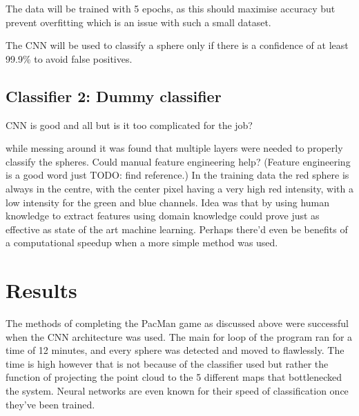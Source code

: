 \documentclass{article}
\begin{document}
The data will be trained with 5 epochs, as this should maximise accuracy but prevent overfitting which is an issue with such a small dataset.


The CNN will be used to classify a sphere only if there is a confidence of at least 99.9\% to avoid false positives. 

\subsection{Classifier 2: Dummy classifier}
CNN is good and all but is it too complicated for the job?

while messing around it was found that multiple layers were needed to properly classify the spheres.
Could manual feature engineering help? (Feature engineering is a good word just TODO: find reference.)
In the training data the red sphere is always in the centre, with the center pixel having a very high red intensity, with a low intensity for the green and blue channels. 
Idea was that by using human knowledge to extract features using domain knowledge could prove just as effective as state of the art machine learning.
Perhaps there'd even be benefits of a computational speedup when a more simple method was used.


\section{Results}

The methods of completing the PacMan game as discussed above were successful when the CNN architecture was used.
The main for loop of the program ran for a time of 12 minutes, and every sphere was detected and moved to flawlessly.
The time is high however that is not because of the classifier used but rather the function of projecting the point cloud to the 5 different maps that bottlenecked the system.
Neural networks are even known for their speed of classification once they've been trained.
\end{document}
